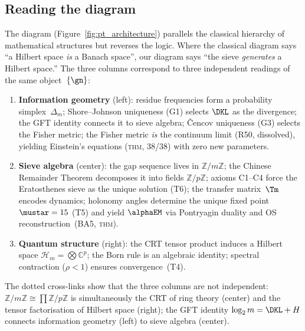 \documentclass[12pt,a4paper]{article}
\begin{document}
\subsection{Reading the diagram}
\label{sec:app_h_reading}

The diagram (Figure~\ref{fig:pt_architecture}) parallels the classical
hierarchy of mathematical structures but reverses the logic.
Where the classical diagram says ``a Hilbert space \emph{is} a
Banach space'', our diagram says ``the sieve \emph{generates}
a Hilbert space.'' The three columns correspond to three
independent readings of the same object~$\{\gn\}$:

\begin{enumerate}[nosep]
\item \textbf{Information geometry} (left):
  residue frequencies form a probability simplex~$\Delta_m$;
  Shore--Johnson uniqueness (G1) selects $\DKL$ as the
  divergence; the GFT identity connects it to sieve algebra;
  \v{C}encov uniqueness (G3) selects the Fisher
  metric; the Fisher metric \emph{is} the continuum limit
  (R50, dissolved), yielding Einstein's equations (\textsc{thm},
  38/38) with zero new parameters.

\item \textbf{Sieve algebra} (center):
  the gap sequence lives in $\mathbb{Z}/m\mathbb{Z}$;
  the Chinese Remainder Theorem decomposes it into fields
  $\mathbb{Z}/p\mathbb{Z}$; axioms C1--C4 force the
  Eratosthenes sieve as the unique solution (T6);
  the transfer matrix~$\Tm$ encodes dynamics;
  holonomy angles determine the unique fixed point
  $\mustar = 15$ (T5) and yield $\alphaEM$ via
  Pontryagin duality and OS reconstruction~(BA5, \textsc{thm}).

\item \textbf{Quantum structure} (right):
  the CRT tensor product induces a Hilbert space
  $\mathcal{H}_m = \bigotimes \mathbb{C}^p$;
  the Born rule is an algebraic identity;
  spectral contraction ($\rho < 1$) ensures convergence~(T4).
\end{enumerate}

The dotted cross-links show that the three columns are not
independent: $\mathbb{Z}/m\mathbb{Z} \cong \prod\mathbb{Z}/p\mathbb{Z}$
is simultaneously the CRT of ring theory (center) and the
tensor factorisation of Hilbert space (right); the GFT identity
$\log_2 m = \DKL + H$ connects information geometry (left) to
sieve algebra (center).
\end{document}
